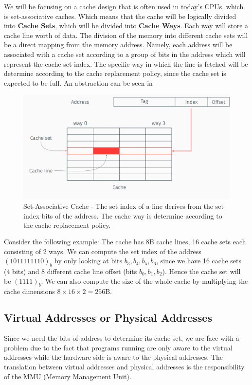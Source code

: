 We will be focusing on a cache design that is often used in today's CPUs, which
is set-associative caches. Which means that the cache will be logically divided
into \textbf{Cache Sets}, which will be divided into \textbf{Cache Ways}. Each
way will store a cache line worth of data. The division of the memory into
different cache sets will be a direct mapping from the memory address. Namely,
each address will be associated with a cache set according to a group of bits in
the address which will represent the cache set index. The specific way in which
the line is fetched will be determine according to the cache
replacement policy, since the cache set is expected to be full.  An abstraction
can be seen in 


\begin{figure}
    \centering
    \includegraphics[width=\textwidth]{images/chapter_6/SetWay.PNG}
    \caption{Set-Associative Cache - The set index of a line derives from the set index bits of the address. The cache way is determine according to the cache replacement policy.}
    \label{fig:SetWay}
\end{figure}

Consider the following example: The cache has 8B cache lines, 16 cache sets each
consisting of 2 ways. We can compute the set index of the address
$(1011111110)_b$ by only looking at bits $b_3, b_4, b_5, b_6$, since we have 16
cache sets (4 bits) and 8 different cache line offset (bits $b_0, b_1, b_2$).
Hence the cache set will be $(1111)_b$. We can also compute the size of the
whole cache by multiplying the cache dimensions $8 \times 16 \times 2 = 256 $B.

\subsection{Virtual Addresses or Physical Addresses}
\label{subsec:addrorphysicaladdr}
Since we need the bits of address to determine its cache set, we are face with a
problem due to the fact that programs running are only aware to the virtual
addresses while the hardware side is aware to the physical addresses. The
translation between virtual addresses and physical addresses is the
responsibility of the MMU (Memory Management Unit).

